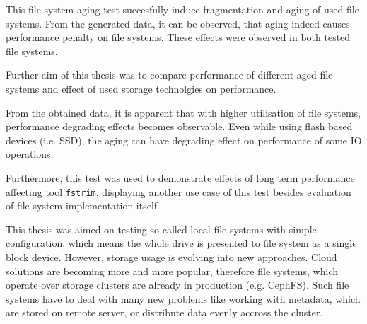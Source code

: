\documentclass[
  color, %
  table, %
  lof,   %
  lot,   %
]{fithesis3}
\begin{document}
This file system aging test succesfully induce fragmentation and aging of used file systems. From the generated data, it can be observed, that aging indeed causes performance penalty on file systems. These effects were observed in both tested file systems.





Further aim of this thesis was to compare performance of different aged file systems and effect of used storage technolgies on performance.

From the obtained data, it is apparent that with higher utilisation of file systems, performance degrading effects becomes observable. Even while using flash based devices (i.e. SSD), the aging can have degrading effect on performance of some IO operations.


Furthermore, this test was used to demonstrate effects of long term performance affecting tool \texttt{fstrim}, displaying another use case of this test besides evaluation of file system implementation itself.


This thesis was aimed on testing so called local file systems with simple configuration, which means the whole drive is presented to file system as a single block device. However, storage usage is evolving into new approaches. Cloud solutions are becoming more and more popular, therefore file systems, which operate over storage clusters are already in production (e.g. CephFS\footnotemark[1]). Such file systems have to deal with many new problems like working with metadata, which are stored on remote server, or distribute data evenly accross the cluster.
\end{document}
